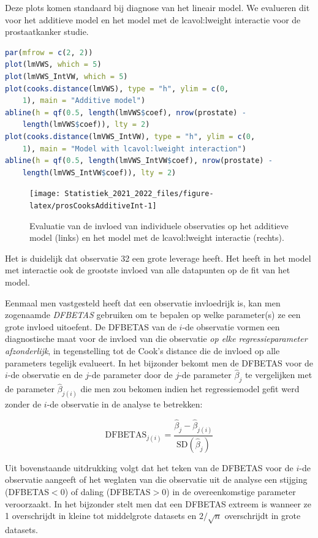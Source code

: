\documentclass[
  12pt,dutch,coursenotes]{book}
\theoremstyle{definition}
\theoremstyle{definition}
\theoremstyle{definition}
\theoremstyle{definition}
\theoremstyle{remark}
\begin{document}
Deze plots komen standaard bij diagnose van het lineair model.
We evalueren dit voor het additieve model en het model met de lcavol:lweight interactie voor de prostaatkanker studie.

\begin{lstlisting}[language=R]
par(mfrow = c(2, 2))
plot(lmVWS, which = 5)
plot(lmVWS_IntVW, which = 5)
plot(cooks.distance(lmVWS), type = "h", ylim = c(0,
    1), main = "Additive model")
abline(h = qf(0.5, length(lmVWS$coef), nrow(prostate) -
    length(lmVWS$coef)), lty = 2)
plot(cooks.distance(lmVWS_IntVW), type = "h", ylim = c(0,
    1), main = "Model with lcavol:lweight interaction")
abline(h = qf(0.5, length(lmVWS_IntVW$coef), nrow(prostate) -
    length(lmVWS_IntVW$coef)), lty = 2)
\end{lstlisting}

\begin{figure}

{\centering \texttt{[image: Statistiek\_2021\_2022\_files/figure-latex/prosCooksAdditiveInt-1]} 

}

\caption{Evaluatie van de invloed van individuele observaties op het additieve model (links) en het model met de lcavol:lweight interactie (rechts).}\label{fig:prosCooksAdditiveInt}
\end{figure}

Het is duidelijk dat observatie 32 een grote leverage heeft. Het heeft in het model met interactie ook de grootste invloed van alle datapunten op de fit van het model.

Eenmaal men vastgesteld heeft dat een observatie invloedrijk is, kan men zogenaamde \emph{DFBETAS} gebruiken om te bepalen op welke parameter(s) ze een grote invloed uitoefent. De DFBETAS van de \(i\)-de observatie vormen een diagnostische maat voor de invloed van die observatie \emph{op elke regressieparameter afzonderlijk}, in tegenstelling tot de Cook's distance die de invloed op alle parameters tegelijk evalueert. In het bijzonder bekomt men de DFBETAS voor de \(i\)-de observatie en de \(j\)-de parameter door de \(j\)-de parameter \(\hat{\beta}_j\) te vergelijken met de parameter \(\hat{\beta}_{j(i)}\) die men zou bekomen indien het regressiemodel gefit werd zonder de \(i\)-de observatie in de analyse te betrekken:

\[\textrm{DFBETAS}_{j(i)}=\frac{\hat{\beta}_{j}-\hat{\beta}_{j(i)}}{\textrm{SD}(\hat{\beta}_{j})}\]

Uit bovenstaande uitdrukking volgt dat het teken van de DFBETAS voor de \(i\)-de observatie aangeeft of het weglaten van die observatie uit de analyse een stijging (DFBETAS\(<0\)) of daling (DFBETAS\(>0\)) in de overeenkomstige parameter veroorzaakt. In het bijzonder stelt men dat een DFBETAS extreem is wanneer ze 1 overschrijdt in kleine tot middelgrote datasets en \(2/\sqrt{n}\) overschrijdt in grote datasets.
\end{document}
